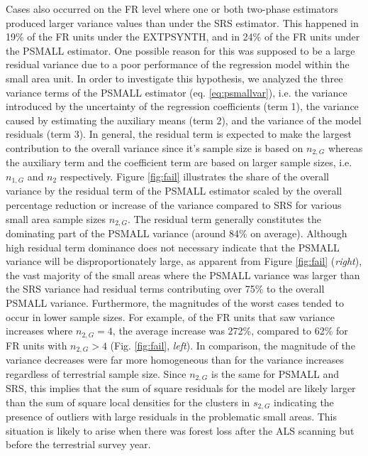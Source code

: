\documentclass[remotesensing,article,submit,moreauthors,pdftex,10pt,a4paper]{mdpi}
\newcommand{\psmall}{PSMALL}
\newcommand{\extpsynth}{EXTPSYNTH}
\begin{document}
Cases also occurred on the FR level where one or both two-phase estimators produced larger variance values than under the SRS estimator. This happened in 19\% of the FR units under the \extpsynth{}, and in 24\% of the FR units under the \psmall{} estimator. One possible reason for this was supposed to be a large residual variance due to a poor performance of the regression model within the small area unit. In order to investigate this hypothesis, we analyzed the three variance terms of the \psmall{} estimator (eq. \ref{eq:psmallvar}), i.e. the variance introduced by the uncertainty of the regression coefficients (term 1), the variance caused by estimating the auxiliary means (term 2), and the variance of the model residuals (term 3). In general, the residual term is expected to make the largest contribution to the overall variance since it's sample size is based on $n_{2,G}$ whereas the auxiliary term and the coefficient term are based on larger sample sizes, i.e. $n_{1,G}$ and $n_2$ respectively. Figure \ref{fig:fail} illustrates the share of the overall variance by the residual term of the \psmall{} estimator scaled by the overall percentage reduction or increase of the variance compared to SRS for various small area sample sizes $n_{2,G}$. The residual term generally constitutes the dominating part of the \psmall{} variance (around 84\% on average). Although high residual term dominance does not necessary indicate that the \psmall{} variance will be disproportionately large, as apparent from Figure \ref{fig:fail} (\textit{right}), the vast majority of the small areas where the \psmall{} variance was larger than the SRS variance had residual terms contributing over 75\% to the overall \psmall{} variance. Furthermore, the magnitudes of the worst cases tended to occur in lower sample sizes. For example, of the FR units that saw variance increases where $n_{2,G}=4$, the average increase was 272\%, compared to 62\% for FR units with $n_{2,G} > 4$ (Fig. \ref{fig:fail}, \textit{left}).  In comparison, the magnitude of the variance decreases were far more homogeneous than for the variance increases regardless of terrestrial sample size. Since $n_{2,G}$ is the same for \psmall{} and SRS, this implies that the sum of square residuals for the model are likely larger than the sum of square local densities for the clusters in $s_{2,G}$ indicating the presence of outliers with large residuals in the problematic small areas. This situation is likely to arise when there was forest loss after the ALS scanning but before the terrestrial survey year. %
\end{document}
